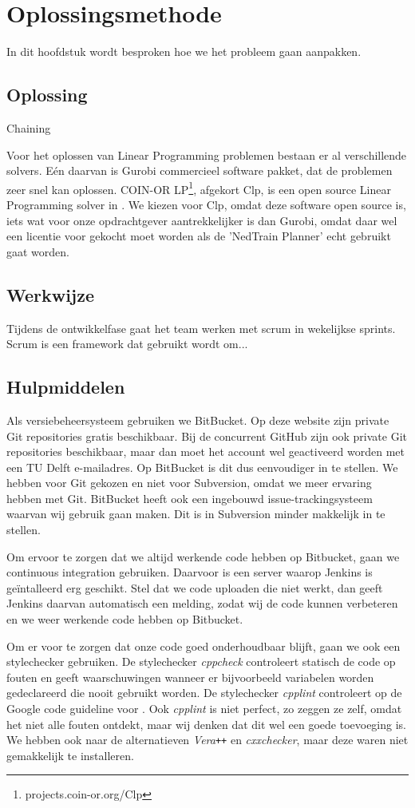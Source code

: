 \section{Oplossingsmethode}
In dit hoofdstuk wordt besproken hoe we het probleem gaan aanpakken. 

\subsection{Oplossing}
Chaining

Voor het oplossen van Linear Programming problemen bestaan er al verschillende solvers. E\'en daarvan is Gurobi commercieel software pakket, dat de problemen zeer snel kan oplossen. COIN-OR LP\footnote{projects.coin-or.org/Clp}, afgekort Clp, is een open source Linear Programming solver in \cpp . We kiezen voor Clp, omdat deze software open source is, iets wat voor onze opdrachtgever aantrekkelijker is dan Gurobi, omdat daar wel een licentie voor gekocht moet worden als de 'NedTrain Planner' echt gebruikt gaat worden.

\subsection{Werkwijze}
Tijdens de ontwikkelfase gaat het team werken met scrum in wekelijkse sprints. Scrum is een framework dat gebruikt wordt om...

\subsection{Hulpmiddelen}
Als versiebeheersysteem gebruiken we BitBucket. Op deze website zijn private Git repositories gratis beschikbaar. Bij de concurrent GitHub zijn ook private Git repositories beschikbaar, maar dan moet het account wel geactiveerd worden met een TU Delft e-mailadres. Op BitBucket is dit dus eenvoudiger in te stellen. We hebben voor Git gekozen en niet voor Subversion, omdat we meer ervaring hebben met Git. BitBucket heeft ook een ingebouwd issue-trackingsysteem waarvan wij gebruik gaan maken. Dit is in Subversion minder makkelijk in te stellen.

Om ervoor te zorgen dat we altijd werkende code hebben op Bitbucket, gaan we continuous integration gebruiken. Daarvoor is een server waarop Jenkins is ge\"intalleerd erg geschikt. Stel dat we code uploaden die niet werkt, dan geeft Jenkins daarvan automatisch een melding, zodat wij de code kunnen verbeteren en we weer werkende code hebben op Bitbucket.  

Om er voor te zorgen dat onze code goed onderhoudbaar blijft, gaan we ook een stylechecker gebruiken. De stylechecker \emph{cppcheck} controleert statisch de code op fouten en geeft waarschuwingen wanneer er bijvoorbeeld variabelen worden gedeclareerd die nooit gebruikt worden. De stylechecker \emph{cpplint} controleert op de Google code guideline voor \cpp. Ook \emph{cpplint} is niet perfect, zo zeggen ze zelf, omdat het niet alle fouten ontdekt, maar wij denken dat dit wel een goede toevoeging is. We hebben ook naar de alternatieven \emph{Vera\texttt{++}} en \emph{cxxchecker}, maar deze waren niet gemakkelijk te installeren.
